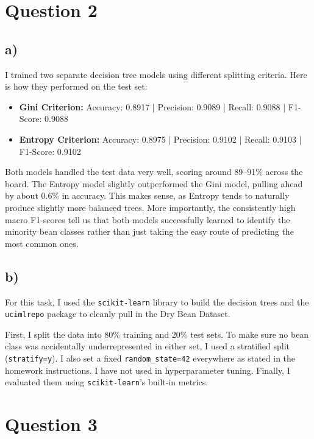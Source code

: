 \documentclass[12pt]{article}
\begin{document}
\vspace{1cm}

\section*{Question 2}

\subsection*{a)}
I trained two separate decision tree models using different splitting criteria. Here is how they performed on the test set:

\begin{itemize}
    \item \textbf{Gini Criterion:} Accuracy: 0.8917 | Precision: 0.9089 | Recall: 0.9088 | F1-Score: 0.9088
    \item \textbf{Entropy Criterion:} Accuracy: 0.8975 | Precision: 0.9102 | Recall: 0.9103 | F1-Score: 0.9102
\end{itemize}

Both models handled the test data very well, scoring around 89--91\% across the board. The Entropy model slightly outperformed the Gini model, pulling ahead by about 0.6\% in accuracy. This makes sense, as Entropy tends to naturally produce slightly more balanced trees. More importantly, the consistently high macro F1-scores tell us that both models successfully learned to identify the minority bean classes rather than just taking the easy route of predicting the most common ones.

\subsection*{b)}
For this task, I used the \texttt{scikit-learn} library to build the decision trees and the \texttt{ucimlrepo} package to cleanly pull in the Dry Bean Dataset. 

First, I split the data into 80\% training and 20\% test sets. To make sure no bean class was accidentally underrepresented in either set, I used a stratified split (\texttt{stratify=y}). I also set a fixed \texttt{random\_state=42} everywhere as stated in the homework instructions. I have not used in hyperparameter tuning. Finally, I evaluated them using \texttt{scikit-learn}'s built-in metrics.

\vspace{1cm}

\section*{Question 3}
\end{document}
